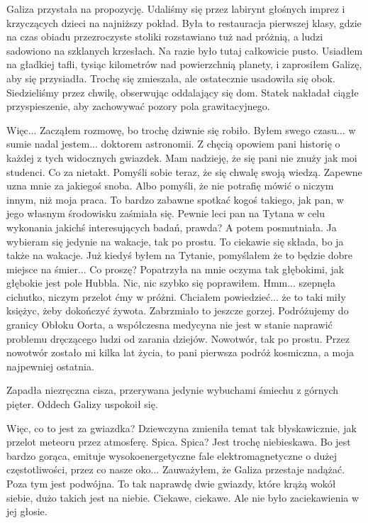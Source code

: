 Galiza przystała na propozycję.
Udaliśmy się przez labirynt głośnych imprez i krzyczących dzieci na najniższy pokład.
Była to restauracja pierwszej klasy, gdzie na czas obiadu przezroczyste stoliki rozstawiano tuż nad próżnią, a ludzi sadowiono na szklanych krzesłach.
Na razie było tutaj całkowicie pusto.
Usiadłem na gładkiej tafli, tysiąc kilometrów nad powierzchnią planety, i zaprosiłem Galizę, aby się przysiadła. Trochę się zmieszała, ale ostatecznie usadowiła się obok.
Siedzieliśmy przez chwilę, obserwując oddalający się dom. Statek nakładał ciągłe przyspieszenie, aby zachowywać pozory pola grawitacyjnego.

\begin{dialogue}
	\ds{} Więc... \dm{} Zacząłem rozmowę, bo trochę dziwnie się robiło. \dm{} Byłem swego czasu... w sumie nadal jestem... doktorem astronomii.
		Z chęcią opowiem pani historię o każdej z tych widocznych gwiazdek. Mam nadzieję, że się pani nie znuży jak moi studenci. \dm{} Co za nietakt. Pomyśli sobie teraz, że się chwalę swoją wiedzą.
		Zapewne uzna mnie za jakiegoś snoba. Albo pomyśli, że nie potrafię mówić o niczym innym, niż moja praca.
	\ds{} To bardzo zabawne spotkać kogoś takiego, jak pan, w jego własnym środowisku \dm{} zaśmiała się. \dm{}
		 Pewnie leci pan na Tytana w celu wykonania jakichś interesujących badań, prawda? \dm{} A potem posmutniała. \dm{} Ja wybieram się jedynie na wakacje, tak po prostu.
	\ds{} To ciekawie się składa, bo ja także na wakacje. Już kiedyś byłem na Tytanie, pomyślałem że to będzie dobre miejsce na śmier...
	\ds{} Co proszę? \dm{} Popatrzyła na mnie oczyma tak głębokimi, jak głębokie jest pole Hubbla.
	\ds{} Nic, nic \dm{} szybko się poprawiłem.
	\ds{} Hmm... \dm{} szepnęła cichutko, niczym przelot ćmy w próżni.
	\ds{} Chciałem powiedzieć... że to taki miły księżyc, żeby dokończyć żywota. \dm{} Zabrzmiało to jeszcze gorzej. 
		\dm{} Podróżujemy do granicy Obłoku Oorta, a współczesna medycyna nie jest w stanie naprawić problemu dręczącego ludzi od zarania dziejów. 
		Nowotwór, tak po prostu. Przez nowotwór zostało mi kilka lat życia, to pani pierwsza podróż kosmiczna, a moja najpewniej ostatnia.
\end{dialogue}

\marker

Zapadła niezręczna cisza, przerywana jedynie wybuchami śmiechu z górnych pięter.
Oddech Galizy uspokoił się.

\begin{dialogue}
	\ds{} Więc, co to jest za gwiazdka? \dm{} Dziewczyna zmieniła temat tak błyskawicznie, jak przelot meteoru przez atmosferę.
	\ds{} Spica. 
	\ds{} Spica? Jest trochę niebieskawa.
	\ds{} Bo jest bardzo gorąca, emituje wysokoenergetyczne fale elektromagnetyczne o dużej częstotliwości, przez co nasze oko... \dm{} Zauważyłem, że Galiza przestaje nadążać.
		\dm{} Poza tym jest podwójna. To tak naprawdę dwie gwiazdy, które krążą wokół siebie, dużo takich jest na niebie.
	\ds{} Ciekawe, ciekawe. \dm{} Ale nie było zaciekawienia w jej głosie.
\end{dialogue}

